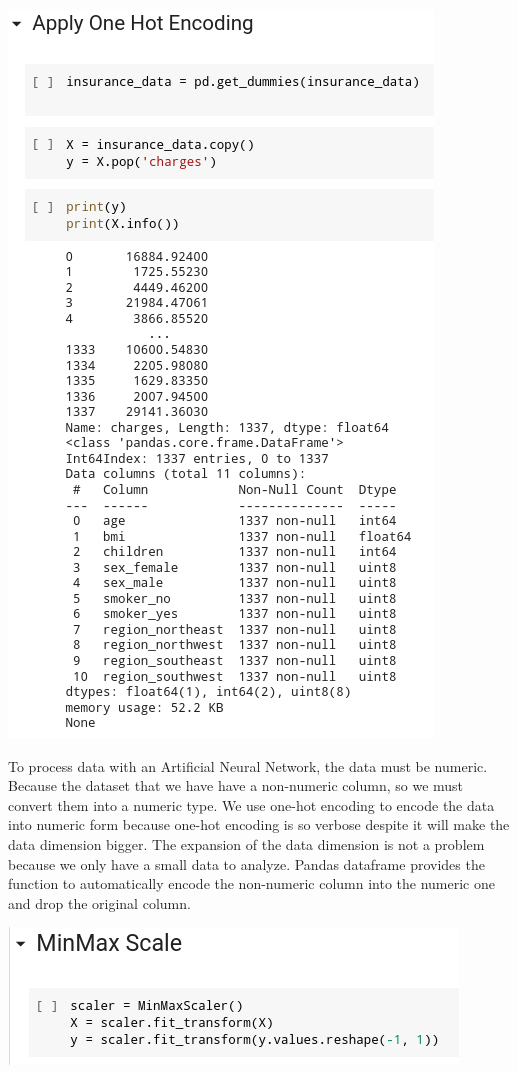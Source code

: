 \documentclass[a4paper, 12pt]{article}
\begin{document}
\begin{multicols}{2}
\centering
\vspace{0.2cm}
\includegraphics[scale=0.4]{one_hot_encoding}
\vspace{0.2cm}

\justifying
To process data with an Artificial Neural Network, the data must be numeric. Because the dataset that we have have a non-numeric column, so we must convert them into a numeric type. We use one-hot encoding to encode the data into numeric form because one-hot encoding is so verbose despite it will make the data dimension bigger. The expansion of the data dimension is not a problem because we only have a small data to analyze. Pandas dataframe provides the function to automatically encode the
  non-numeric column into the numeric one and drop the original column.

\centering
\vspace{0.2cm}
\includegraphics[scale=0.4]{min-max}
\vspace{0.2cm}


\end{multicols}
\end{document}
